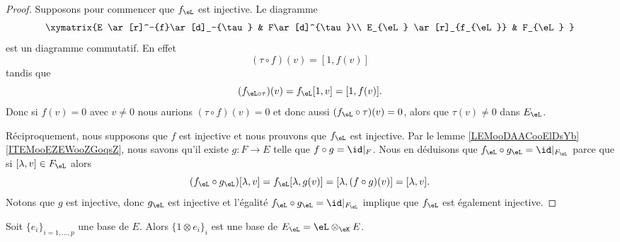 \begin{proof}
    Supposons pour commencer que \( f_{\eL}\) est injective.
    Le diagramme
    \begin{equation}
        \xymatrix{%
            E \ar[r]^-{f}\ar[d]_-{\tau}      &   F\ar[d]^{\tau}\\
            E_{\eL} \ar[r]_{f_{\eL}}  &   F_{\eL}
           }
    \end{equation}
    est un diagramme commutatif. En effet 
    \begin{equation}
        (\tau\circ f)(v)=[1,f(v)]
    \end{equation}
    tandis que 
    \begin{equation}
        (f_{\eL\circ\tau})(v)=f_{\eL}[1,v]=[1,f(v)].
    \end{equation}
    Donc si \( f(v)=0\) avec \( v\neq 0\) nous aurions \( (\tau\circ f)(v)=0\) et donc aussi \( (f_{\eL}\circ \tau)(v)=0\), alors que \( \tau(v)\neq 0\) dans \( E_{\eL}\).

    Réciproquement, nous supposons que \( f\) est injective et nous prouvons que \( f_{\eL}\) est injective. Par le lemme \ref{LEMooDAACooElDsYb}\ref{ITEMooEZEWooZGoqsZ}, nous savons qu'il existe \( g\colon F\to E\) telle que \( f\circ g=\id|_F\). Nous en déduisons que \( f_{\eL}\circ g_{\eL}=\id|_{F_{\eL}}\) parce que si \( [\lambda,v]\in F_{\eL}\) alors
    \begin{equation}
        (f_{\eL}\circ g_{\eL})[\lambda,v]=f_{\eL}[\lambda,g(v)]=[\lambda,(f\circ g)(v)]=[\lambda,v].
    \end{equation}
    Notons que \( g\) est injective, donc \( g_{\eL}\) est injective et l'égalité \( f_{\eL}\circ g_{\eL}=\id|_{F_{\eL}} \) implique que \( f_{\eL}\) est également injective.
\end{proof}

\begin{proposition} \label{PROPooMHARooUycAts}
    Soit \( \{ e_i \}_{i=1,\ldots, p}\) une base de \( E\). Alors \( \{ 1\otimes e_i \}_i\) est une base de \( E_{\eL}=\eL\otimes_{\eK}E\).
\end{proposition}

